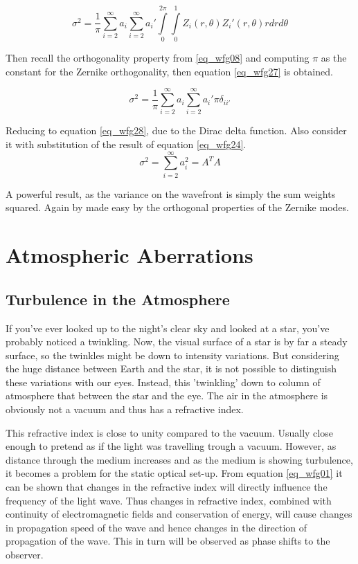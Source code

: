 \documentclass{article}
\begin{document}
\begin{equation}
\sigma^2 = \frac{1}{\pi} \sum \limits_{i=2}^{\infty} a_i \sum \limits_{i=2}^{\infty} a_i' \int \limits_0^{2 \pi} \int \limits_0^1 Z_i(r,\theta) Z_i'(r,\theta) r dr d\theta
\label{eq_wfg26}
\end{equation}

Then recall the orthogonality property from \ref{eq_wfg08} and computing $\pi$ as the constant for the Zernike orthogonality, then equation \ref{eq_wfg27} is obtained.

\begin{equation}
\sigma^2 = \frac{1}{\pi} \sum \limits_{i=2}^{\infty} a_i \sum \limits_{i=2}^{\infty} a_i' \pi \delta_{ii'}
\label{eq_wfg27}
\end{equation}

Reducing to equation \ref{eq_wfg28}, due to the Dirac delta function. Also consider it with substitution of the result of equation \ref{eq_wfg24}.
\begin{equation}
\sigma^2 = \sum \limits_{i=2}^{\infty} a_i^2 = A^T A
\label{eq_wfg28}
\end{equation}

A powerful result, as the variance on the wavefront is simply the sum weights squared. Again by made easy by the orthogonal properties of the Zernike modes.

\newpage
\section{Atmospheric Aberrations}
\subsection{Turbulence in the Atmosphere}
If you've ever looked up to the night's clear sky and looked at a star, you've probably noticed a twinkling. Now, the visual surface of a star is by far a steady surface, so the twinkles might be down to intensity variations. But considering the huge distance between Earth and the star, it is not possible to distinguish these variations with our eyes. Instead, this 'twinkling' down to column of atmosphere that between the star and the eye. The air in the atmosphere is obviously not a vacuum and thus has a refractive index. 

This refractive index is close to unity compared to the vacuum. Usually close enough to pretend as if the light was travelling trough a vacuum. However, as distance through the medium increases and as the medium is showing turbulence, it becomes a problem for the static optical set-up. From equation \ref{eq_wfg01} it can be shown that changes in the refractive index will directly influence the frequency of the light wave. Thus changes in refractive index, combined with continuity of electromagnetic fields and conservation of energy, will cause changes in propagation speed of the wave and hence changes in the direction of propagation of the wave. This in turn will be observed as phase shifts to the observer.
\end{document}
